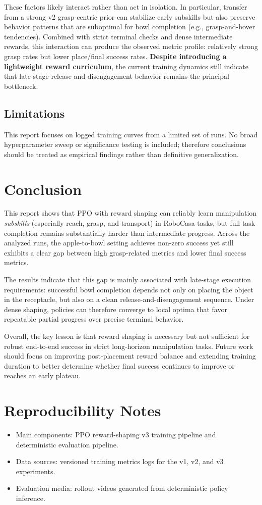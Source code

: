 \documentclass[11pt,a4paper]{article}
\begin{document}
\noindent These factors likely interact rather than act in isolation. In particular, transfer from a strong v2 grasp-centric prior can stabilize early subskills but also preserve behavior patterns that are suboptimal for bowl completion (e.g., grasp-and-hover tendencies). Combined with strict terminal checks and dense intermediate rewards, this interaction can produce the observed metric profile: relatively strong grasp rates but lower place/final success rates. \textbf{Despite introducing a lightweight reward curriculum}, the current training dynamics still indicate that late-stage release-and-disengagement behavior remains the principal bottleneck.

\subsection{Limitations}
This report focuses on logged training curves from a limited set of runs. No broad hyperparameter sweep or significance testing is included; therefore conclusions should be treated as empirical findings rather than definitive generalization.

\section{Conclusion}
This report shows that PPO with reward shaping can reliably learn manipulation \emph{subskills} (especially reach, grasp, and transport) in RoboCasa tasks, but full task completion remains substantially harder than intermediate progress. Across the analyzed runs, the apple-to-bowl setting achieves non-zero success yet still exhibits a clear gap between high grasp-related metrics and lower final success metrics.

The results indicate that this gap is mainly associated with late-stage execution requirements: successful bowl completion depends not only on placing the object in the receptacle, but also on a clean release-and-disengagement sequence. Under dense shaping, policies can therefore converge to local optima that favor repeatable partial progress over precise terminal behavior.

Overall, the key lesson is that reward shaping is necessary but not sufficient for robust end-to-end success in strict long-horizon manipulation tasks. Future work should focus on improving post-placement reward balance and extending training duration to better determine whether final success continues to improve or reaches an early plateau.

\section*{Reproducibility Notes}
\begin{itemize}
    \item Main components: PPO reward-shaping v3 training pipeline and deterministic evaluation pipeline.
    \item Data sources: versioned training metrics logs for the v1, v2, and v3 experiments.
    \item Evaluation media: rollout videos generated from deterministic policy inference.
\end{itemize}
\end{document}
